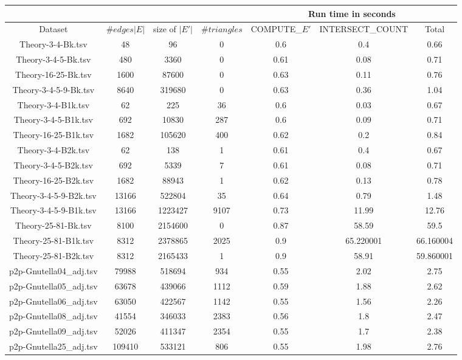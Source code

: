\documentclass[conference]{IEEEtran}
\begin{document}
\begin{table*}[ht]
\centering
 \begin{tabular}{|c || c | c | c || c | c | c |} 
 \hline
 \multicolumn{4}{|c||}{}&\multicolumn{3}{|c|}{Run time in seconds} \\
 \hline
 Dataset & $\#edges |E|$ & size of $|E'|$ & $\#triangles$ & COMPUTE\_$E'$ & INTERSECT\_COUNT & Total \\ [0.5ex] 
 \hline\hline
 Theory-3-4-Bk.tsv & 48 & 96 & 0 & 0.6 & 0.4 & 0.66 \\
 \hline
 Theory-3-4-5-Bk.tsv & 480 & 3360 & 0 & 0.61 & 0.08 & 0.71 \\
 \hline
 Theory-16-25-Bk.tsv & 1600 & 87600 & 0 & 0.63 & 0.11 & 0.76 \\
 \hline
 Theory-3-4-5-9-Bk.tsv & 8640 & 319680 & 0 & 0.63 & 0.36 & 1.04 \\
 \hline
 Theory-3-4-B1k.tsv & 62 & 225 & 36 & 0.6 & 0.03 & 0.67 \\
 \hline
 Theory-3-4-5-B1k.tsv & 692 & 10830 & 287 & 0.6 & 0.09 & 0.71 \\
 \hline
 Theory-16-25-B1k.tsv & 1682 & 105620 & 400 & 0.62 & 0.2 & 0.84 \\
 \hline
 Theory-3-4-B2k.tsv & 62 & 138 & 1 & 0.61 & 0.4 & 0.67 \\
 \hline
 Theory-3-4-5-B2k.tsv & 692 & 5339 & 7 & 0.61 & 0.08 & 0.71 \\
 \hline
 Theory-16-25-B2k.tsv & 1682 & 88943 & 1 & 0.62 & 0.13 & 0.78 \\
 \hline
 Theory-3-4-5-9-B2k.tsv & 13166 & 522804 & 35 & 0.64 & 0.79 & 1.48 \\
 \hline\hline
 
 Theory-3-4-5-9-B1k.tsv & 13166 & 1223427 & 9107 & 0.73 & 11.99 & 12.76 \\
 \hline
 Theory-25-81-Bk.tsv & 8100 & 2154600 & 0 & 0.87 & 58.59 & 59.5 \\
 \hline
 Theory-25-81-B1k.tsv & 8312 & 2378865 & 2025 & 0.9 & 65.220001 & 66.160004 \\
 \hline
 Theory-25-81-B2k.tsv & 8312 & 2165433 & 1 & 0.9 & 58.91 & 59.860001 \\
 \hline\hline\hline

 p2p-Gnutella04\_adj.tsv & 79988 & 518694 & 934 & 0.55 & 2.02 & 2.75 \\
 \hline
 p2p-Gnutella05\_adj.tsv & 63678 & 439066 & 1112 & 0.59 & 1.88 & 2.62 \\
 \hline
 p2p-Gnutella06\_adj.tsv & 63050 & 422567 & 1142 & 0.55 & 1.56 & 2.26 \\
 \hline
 p2p-Gnutella08\_adj.tsv & 41554 & 346033 & 2383 & 0.56 & 1.8 & 2.47 \\
 \hline
 p2p-Gnutella09\_adj.tsv & 52026 & 411347 & 2354 & 0.55 & 1.7 & 2.38 \\
 \hline
 p2p-Gnutella25\_adj.tsv & 109410 & 533121 & 806 & 0.55 & 1.98 & 2.76 \\
 \hline\hline


\end{tabular}
\end{table*}
\end{document}
